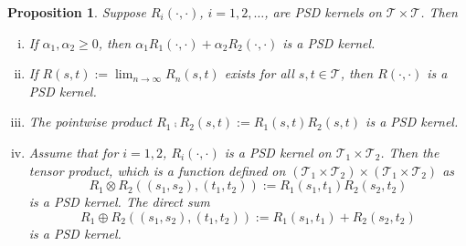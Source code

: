 \documentclass[11pt]{article}
\theoremstyle{plain}
\newtheorem{proposition}{\quad\quad Proposition}
\theoremstyle{definition}
\theoremstyle{remark}
\begin{document}
\begin{proposition}\label{prop1}
    Suppose $R_i(\cdot,\cdot)$, $i=1,2,\ldots$, are PSD kernels on $\mathcal{T} \times \mathcal{T}$. Then
    \begin{enumerate}[(i)]
        \item If $\alpha_1,\alpha_2 \geq 0 $, then $\alpha_1 R_1(\cdot,\cdot)+\alpha_2 R_2(\cdot,\cdot)$ is a PSD kernel.
        \item If $R(s,t):=\lim_{n\to \infty} R_n(s,t)$ exists for all $s,t\in \mathcal{T}$, then $R(\cdot,\cdot)$ is a PSD kernel.
        \item The pointwise product $R_1\comp R_2 (s,t):=R_1(s,t)R_2(s,t)$ is a PSD kernel.
        \item 
            Assume that for $i=1,2$, $R_i(\cdot,\cdot)$ is a PSD kernel on $\mathcal{T}_1 \times \mathcal{T}_2$.
        Then the tensor product, which is a function defined on $(\mathcal{T}_1\times \mathcal{T}_2)\times (\mathcal{T}_1\times \mathcal{T}_2)$ as 
            \begin{equation*}
                R_1 \otimes R_2 \left((s_1,s_2),(t_1,t_2)\right)
                := R_1 (s_1,t_1) R_2(s_2,t_2)
            \end{equation*}
            is a PSD kernel.
            The direct sum
            \begin{equation*}
                R_1 \oplus R_2 \left((s_1,s_2),(t_1,t_2)\right)
                :=
                R_1 (s_1,t_1) + R_2(s_2,t_2)
            \end{equation*}
            is a PSD kernel.
    \end{enumerate}
\end{proposition}
\end{document}
